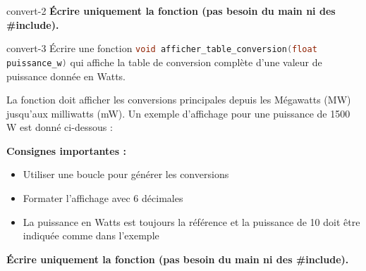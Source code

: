 {\begin{question}{convert-2}
        \textbf{Écrire uniquement la fonction (pas besoin du main ni des \#include).}

    \end{question}

    \begin{question}{convert-3}
        Écrire une fonction \lstinline[language=C]|void afficher_table_conversion(float puissance_w)| qui affiche la table de conversion complète d'une valeur de puissance donnée en Watts.

        La fonction doit afficher les conversions principales depuis les Mégawatts (MW) jusqu'aux milliwatts (mW). Un exemple d'affichage pour une puissance de 1500 W est donné ci-dessous :
        


        \textbf{Consignes importantes :}
        \begin{itemize}
            \item Utiliser une boucle pour générer les conversions
            \item Formater l'affichage avec 6 décimales
            \item La puissance en Watts est toujours la référence et la puissance de 10 doit être indiquée comme dans l'exemple
        \end{itemize}

        \textbf{Écrire uniquement la fonction (pas besoin du main ni des \#include).}

    \end{question}
}

